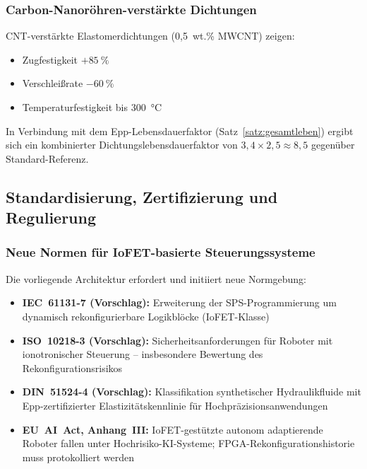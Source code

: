 ﻿\documentclass[a4paper,12pt]{scrreprt}
\theoremstyle{definition}
\begin{document}
\subsubsection{Carbon-Nanoröhren-verstärkte Dichtungen}

CNT-verstärkte Elastomerdichtungen (0{,}5~wt.\% MWCNT) zeigen:
\begin{itemize}
  \item Zugfestigkeit $+\SI{85}{\percent}$
  \item Verschleißrate $-\SI{60}{\percent}$
  \item Temperaturfestigkeit bis \SI{300}{\celsius}
\end{itemize}
In Verbindung mit dem Epp-Lebensdauerfaktor (Satz~\ref{satz:gesamtleben})
ergibt sich ein kombinierter Dichtungslebensdauerfaktor von
$3{,}4 \times 2{,}5 \approx 8{,}5$ gegenüber Standard-Referenz.

\subsection{Standardisierung, Zertifizierung und Regulierung}

\subsubsection{Neue Normen für IoFET-basierte Steuerungssysteme}

Die vorliegende Architektur erfordert und initiiert neue Normgebung:

\begin{itemize}
  \item \textbf{IEC~61131-7 (Vorschlag):} Erweiterung der SPS-Programmierung
        um dynamisch rekonfigurierbare Logikblöcke (IoFET-Klasse)
  \item \textbf{ISO~10218-3 (Vorschlag):} Sicherheitsanforderungen für
        Roboter mit ionotronischer Steuerung -- insbesondere Bewertung
        des Rekonfigurationsrisikos
  \item \textbf{DIN~51524-4 (Vorschlag):} Klassifikation synthetischer
        Hydraulikfluide mit Epp-zertifizierter Elastizitätskennlinie
        für Hochpräzisionsanwendungen
  \item \textbf{EU~AI~Act, Anhang~III:} IoFET-gestützte autonom
        adaptierende Roboter fallen unter Hochrisiko-KI-Systeme;
        FPGA-Rekonfigurationshistorie muss protokolliert werden
\end{itemize}
\end{document}
